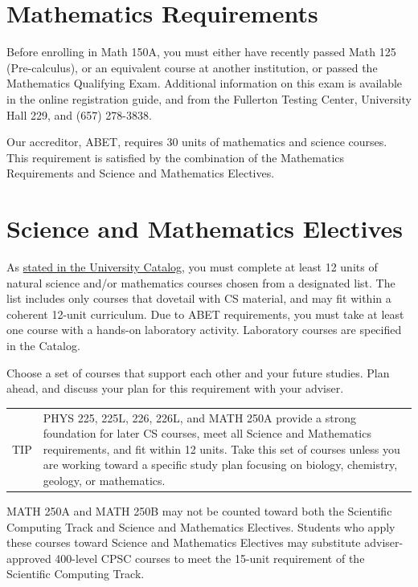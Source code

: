 \documentclass{book}
\newenvironment{tip}
    {\tcolorbox \begin{tabular}{m{.5in} m{5in}} \Large{TIP} & }
    {\end{tabular} \endtcolorbox}
\begin{document}
\section{Mathematics Requirements}

Before enrolling in Math 150A, you must either have recently passed Math 125 (Pre-calculus), or an equivalent course at another institution, or passed the Mathematics Qualifying Exam. Additional information on this exam is available in the online registration guide, and from the Fullerton Testing Center, University Hall 229, and (657) 278-3838.

Our accreditor, ABET, requires 30 units of mathematics and science courses. This requirement is satisfied by the combination of the Mathematics Requirements and Science and Mathematics Electives.

\section{Science and Mathematics Electives}

As \href{http://catalog.fullerton.edu/preview_program.php?catoid=2&poid=537&returnto=137}{stated in the University Catalog}, you must complete at least 12 units of natural science and/or mathematics courses chosen from a designated list. The list includes only courses that dovetail with CS material, and may fit within a coherent 12-unit curriculum. Due to ABET requirements, you must take at least one course with a hands-on laboratory activity. Laboratory courses are specified in the Catalog.

Choose a set of courses that support each other and your future studies. Plan ahead, and discuss your plan for this requirement with your adviser.

\begin{tip}
PHYS 225, 225L, 226, 226L, and MATH 250A provide a strong foundation for later CS courses, meet all Science and Mathematics requirements, and fit within 12 units. Take this set of courses unless you are working toward a specific study plan focusing on biology, chemistry, geology, or mathematics.
\end{tip}

MATH 250A and MATH 250B may not be counted toward both the Scientific Computing Track  and Science and Mathematics Electives. Students who apply these courses toward Science and Mathematics Electives may substitute adviser-approved 400-level CPSC courses to meet the 15-unit requirement of the Scientific Computing Track.
\end{document}
